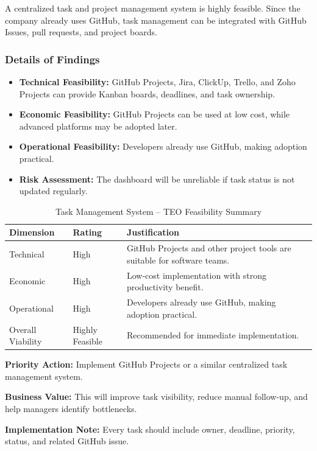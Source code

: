 \documentclass[12pt,a4paper]{report}
\begin{document}
\begin{summaryBox}
A centralized task and project management system is highly feasible. Since the company already uses GitHub, task management can be integrated with GitHub Issues, pull requests, and project boards.
\end{summaryBox}

\subsubsection{Details of Findings}

\begin{itemize}[leftmargin=*]
    \item \textbf{Technical Feasibility:} GitHub Projects, Jira, ClickUp, Trello, and Zoho Projects can provide Kanban boards, deadlines, and task ownership.
    \item \textbf{Economic Feasibility:} GitHub Projects can be used at low cost, while advanced platforms may be adopted later.
    \item \textbf{Operational Feasibility:} Developers already use GitHub, making adoption practical.
    \item \textbf{Risk Assessment:} The dashboard will be unreliable if task status is not updated regularly.
\end{itemize}

\begin{table}[H]
\centering
\caption{Task Management System -- TEO Feasibility Summary}
\renewcommand{\arraystretch}{1.3}
\begin{tabularx}{\textwidth}{|p{3cm}|p{2.5cm}|X|}
\hline
\rowcolor{secondary}
\textbf{Dimension} & \textbf{Rating} & \textbf{Justification} \\
\hline
Technical & High & GitHub Projects and other project tools are suitable for software teams. \\
\hline
Economic & High & Low-cost implementation with strong productivity benefit. \\
\hline
Operational & High & Developers already use GitHub, making adoption practical. \\
\hline
Overall Viability & Highly Feasible & Recommended for immediate implementation. \\
\hline
\end{tabularx}
\end{table}

\begin{recommendBox}
\textbf{Priority Action:} Implement GitHub Projects or a similar centralized task management system.

\textbf{Business Value:} This will improve task visibility, reduce manual follow-up, and help managers identify bottlenecks.

\textbf{Implementation Note:} Every task should include owner, deadline, priority, status, and related GitHub issue.
\end{recommendBox}
\end{document}

